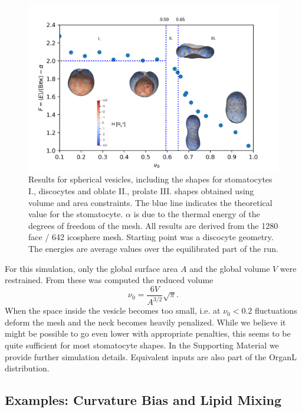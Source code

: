 \documentclass[twocolumn]{biophys-new}
\begin{document}
\begin{figure}[hbt]
\centering
\includegraphics[width=\linewidth]{fig/Fig_phase_upd3-crop.pdf}
\caption{Results for spherical vesicles, including the shapes for stomatocytes I., discocytes and oblate II., prolate  III. shapes obtained using volume and area constraints. The blue line indicates the theoretical value for the stomatocyte. $\alpha$ is due to the thermal energy of the degrees of freedom of the mesh. All results are derived from the 1280 face / 642 icosphere mesh. Starting point was a discocyte geometry. The energies are average values over the equilibrated part of the run.}
\label{fig:diagram}
\end{figure}


For this simulation, only the global surface area $A$ and the global volume $V$ were restrained. From these was computed the reduced volume
\begin{equation}
 \nu_0 = \frac{6V}{A^{3/2}}\sqrt{\pi}.
\end{equation}
When the space inside the vesicle becomes too small, i.e. at $\nu_0<0.2$ fluctuations deform the mesh and the neck becomes heavily penalized. While we believe it might be possible to go even lower with appropriate penalties, this seems to be quite sufficient for most stomatocyte shapes. In the Supporting Material we provide further simulation details. Equivalent inputs are also part of the OrganL distribution.

\subsection*{Examples: Curvature Bias and Lipid Mixing}
\end{document}
